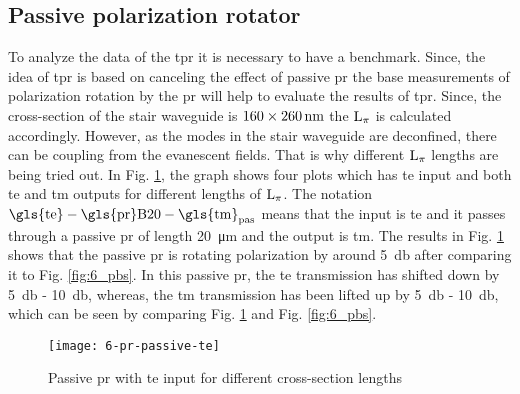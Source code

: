 \documentclass[../report.tex]{subfiles}
\begin{document}
	\subsection{Passive polarization rotator}
	To analyze the data of the \gls{tpr} it is necessary to have a benchmark. Since, the idea of \gls{tpr} is based on canceling the effect of passive \gls{pr} the base measurements of polarization rotation by the \gls{pr} will help to evaluate the results of \gls{tpr}. Since, the cross-section of the stair waveguide is $\mathrm{160 \times \SI{260}{\nano \meter}}$ the $\mathrm{L_\pi}$ is calculated accordingly. However, as the modes in the stair waveguide are deconfined, there can be coupling from the evanescent fields. That is why different $\mathrm{L_\pi}$ lengths are being tried out. In Fig. \ref{fig:6_pr_passive_te}, the graph shows four plots which has \gls{te} input and both \gls{te} and \gls{tm} outputs for different lengths of $\mathrm{L_\pi}$. The notation $\chem{\gls{te}-\gls{pr}B20-\gls{tm}_{pas}}$ means that the input is \gls{te} and it passes through a passive \gls{pr} of length \SI{20}{\micro \meter} and the output is \gls{tm}. The results in Fig.  \ref{fig:6_pr_passive_te} shows that the passive \gls{pr} is rotating polarization by around \SI{5}{\decibel} after comparing it to Fig. \ref{fig:6_pbs}. In this passive \gls{pr}, the \gls{te} transmission has shifted down by \SI{5}{\decibel} - \SI{10}{\decibel}, whereas, the \gls{tm} transmission has been lifted up by \SI{5}{\decibel} - \SI{10}{\decibel}, which can be seen by comparing Fig. \ref{fig:6_pr_passive_te} and Fig. \ref{fig:6_pbs}.
	
	\begin{figure}[H] %
		\centering
		\texttt{[image: 6-pr-passive-te]}
		\caption{Passive \gls{pr} with \gls{te} input for different cross-section lengths}
		\label{fig:6_pr_passive_te}
	\end{figure}
	
\end{document}
